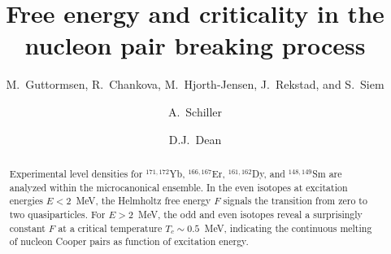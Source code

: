 
\draft



\title{Free energy and criticality in the nucleon pair breaking process}
\author{M.~Guttormsen, R.~Chankova, M.~Hjorth-Jensen, J.~Rekstad, and S.~Siem}
\address{Department of Physics, University of Oslo, N-0316 Oslo, Norway}
\author{A.~Schiller}
\address{Lawrence Livermore National Laboratory, L-414, 7000 East Avenue,
Livermore, California 94551, U.S.A.}
\author{D.J.~Dean}
\address{Physics Division, Oak Ridge National Laboratory, P.O. Box 
2008, Oak Ridge, Tennessee 37831, U.S.A.}
\maketitle

\begin{abstract}
Experimental level densities for $^{171,172}$Yb, $^{166,167}$Er, 
$^{161,162}$Dy, and $^{148,149}$Sm are analyzed within the microcanonical 
ensemble. In the even isotopes at excitation energies $E<2$~MeV, the Helmholtz 
free energy $F$ signals the transition from zero to two quasiparticles. For 
$E>2$~MeV, the odd and even isotopes reveal a surprisingly constant $F$ at a 
critical temperature $T_c\sim 0.5$~MeV, indicating the continuous melting of 
nucleon Cooper pairs as function of excitation energy.
\end{abstract}


